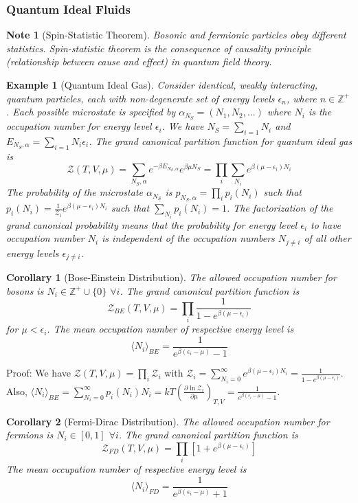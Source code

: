 \documentclass[a4paper]{article}
\newtheorem{note}{Note}[section]
\newtheorem{eg}{Example}[section]
\newtheorem{cor}{Corollary}[section]
\theoremstyle{new}
\begin{document}
\subsubsection*{Quantum Ideal Fluids}
\begin{note}[Spin-Statistic Theorem]
Bosonic and fermionic particles obey different statistics. Spin-statistic theorem is the consequence of causality principle (relationship between cause and effect) in quantum field theory. 
\end{note}
\begin{eg}[Quantum Ideal Gas]
Consider identical, weakly interacting, quantum particles, each with non-degenerate set of energy levels $\epsilon_n$, where $n\in\mathbb{Z}^+$. Each possible microstate is specified by $\alpha_{N_S}=(N_1,N_2,...)$ where $N_i$ is the occupation number for energy level $\epsilon_i$. We have $N_S=\sum_{i=1}N_i$ and $E_{N_S,\alpha}=\sum_{i=1}N_i\epsilon_i$. The grand canonical partition function for quantum ideal gas is
$$\mathcal{Z}(T,V,\mu)=\sum_{N_S,\alpha}e^{-\beta E_{N_S,\alpha}}e^{\beta\mu N_S}=\prod_i\sum_{N_i}e^{\beta(\mu-\epsilon_i)N_i}$$
The probability of the microstate $\alpha_{N_S}$ is $p_{N_S,\alpha}=\prod_ip_i(N_i)$ such that $p_i(N_i)=\frac{1}{\mathcal{Z}_i}e^{\beta(\mu-\epsilon_i)N_i}$ such that $\sum_{N_i}p_i(N_i)=1$. The factorization of the grand canonical probability means that the probability for energy level $\epsilon_i$ to have occupation number $N_i$ is independent of the occupation numbers $N_{j\neq i}$ of all other energy levels $\epsilon_{j\neq i}$.
\end{eg}
\begin{cor}[Bose-Einstein Distribution]
The allowed occupation number for bosons is $N_i\in\mathbb{Z}^+\cup\{0\}$ $\forall i$. The grand canonical partition function is
$$\mathcal{Z}_{BE}(T,V,\mu)=\prod_i\frac{1}{1-e^{\beta(\mu-\epsilon_i)}}$$
for $\mu<\epsilon_i$. The mean occupation number of respective energy level is
$$\langle N_i\rangle_{BE}=\frac{1}{e^{\beta(\epsilon_i-\mu)}-1}$$
\end{cor}
Proof: We have $\mathcal{Z}(T,V,\mu)=\prod_i\mathcal{Z}_i$ with $\mathcal{Z}_i=\sum_{N_i=0}^\infty e^{\beta(\mu-\epsilon_i)N_i}=\frac{1}{1-e^{\beta(\mu-\epsilon_i)}}$. Also, $\langle N_i\rangle_{BE}=\sum_{N_i=0}^\infty p_i(N_i)N_i=kT(\frac{\partial\ln\mathcal{Z}_i}{\partial\mu})_{T,V}=\frac{1}{e^{\beta(\epsilon_i-\mu)}-1}$.
\begin{cor}[Fermi-Dirac Distribution]
The allowed occupation number for fermions is $N_i\in[0,1]$ $\forall i$. The grand canonical partition function is
$$\mathcal{Z}_{FD}(T,V,\mu)=\prod_i[1+e^{\beta(\mu-\epsilon_i)}]$$
The mean occupation number of respective energy level is
$$\langle N_i\rangle_{FD}=\frac{1}{e^{\beta(\epsilon_i-\mu)}+1}$$
\end{cor}
\end{document}
